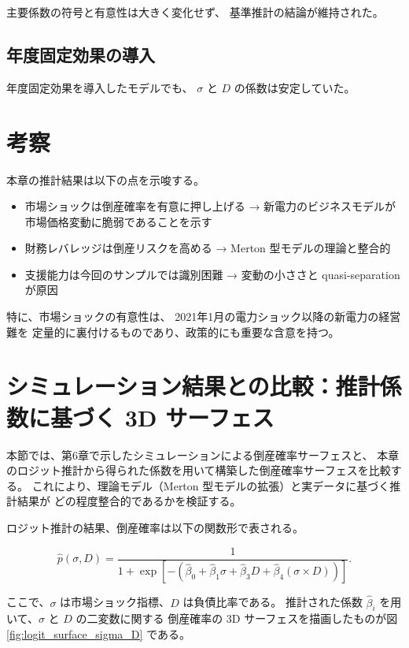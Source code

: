 主要係数の符号と有意性は大きく変化せず、
基準推計の結論が維持された。

\subsection{年度固定効果の導入}

年度固定効果を導入したモデルでも、
$\sigma$ と $D$ の係数は安定していた。

\section{考察}
\label{sec:discussion}

本章の推計結果は以下の点を示唆する。

\begin{itemize}
  \item 市場ショックは倒産確率を有意に押し上げる  
        → 新電力のビジネスモデルが市場価格変動に脆弱であることを示す
  \item 財務レバレッジは倒産リスクを高める  
        → Merton 型モデルの理論と整合的
  \item 支援能力は今回のサンプルでは識別困難  
        → 変動の小ささと quasi-separation が原因
\end{itemize}

特に、市場ショックの有意性は、
2021年1月の電力ショック以降の新電力の経営難を
定量的に裏付けるものであり、政策的にも重要な含意を持つ。

\section{シミュレーション結果との比較：推計係数に基づく 3D サーフェス}
\label{sec:logit_surface_comparison}

本節では、第6章で示したシミュレーションによる倒産確率サーフェスと、
本章のロジット推計から得られた係数を用いて構築した倒産確率サーフェスを比較する。
これにより、理論モデル（Merton 型モデルの拡張）と実データに基づく推計結果が
どの程度整合的であるかを検証する。

ロジット推計の結果、倒産確率は以下の関数形で表される。



\[
\hat{p}(\sigma, D)
=
\frac{1}{1 + \exp\left[-\left(
\hat{\beta}_0
+ \hat{\beta}_1 \sigma
+ \hat{\beta}_3 D
+ \hat{\beta}_4 (\sigma \times D)
\right)\right]}.
\]



ここで、$\sigma$ は市場ショック指標、$D$ は負債比率である。
推計された係数 $\hat{\beta}_i$ を用いて、$\sigma$ と $D$ の二変数に関する
倒産確率の 3D サーフェスを描画したものが図 \ref{fig:logit_surface_sigma_D} である。

